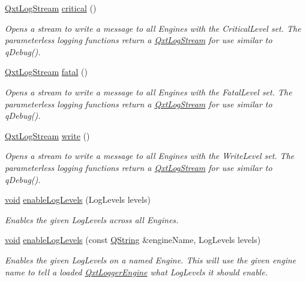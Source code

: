 \begin{DoxyCompactItemize}
\hyperlink{class_qxt_log_stream}{Qxt\-Log\-Stream} \hyperlink{class_qxt_logger_a79869cad074c4d85e35ce0b5f1ea0458}{critical} ()
\begin{DoxyCompactList}\small\item\em Opens a stream to write a message to all Engines with the Critical\-Level set. The parameterless logging functions return a \hyperlink{class_qxt_log_stream}{Qxt\-Log\-Stream} for use similar to q\-Debug(). \end{DoxyCompactList}\item 
\hyperlink{class_qxt_log_stream}{Qxt\-Log\-Stream} \hyperlink{class_qxt_logger_a1b8e6e6c804011db81b59656d0a55081}{fatal} ()
\begin{DoxyCompactList}\small\item\em Opens a stream to write a message to all Engines with the Fatal\-Level set. The parameterless logging functions return a \hyperlink{class_qxt_log_stream}{Qxt\-Log\-Stream} for use similar to q\-Debug(). \end{DoxyCompactList}\item 
\hyperlink{class_qxt_log_stream}{Qxt\-Log\-Stream} \hyperlink{class_qxt_logger_ac01dffce7f7f018f434c70e9557f95f1}{write} ()
\begin{DoxyCompactList}\small\item\em Opens a stream to write a message to all Engines with the Write\-Level set. The parameterless logging functions return a \hyperlink{class_qxt_log_stream}{Qxt\-Log\-Stream} for use similar to q\-Debug(). \end{DoxyCompactList}\item 
\hyperlink{group___u_a_v_objects_plugin_ga444cf2ff3f0ecbe028adce838d373f5c}{void} \hyperlink{class_qxt_logger_a84d81e3625ab75fec30a33610ccedc8a}{enable\-Log\-Levels} (Log\-Levels levels)
\begin{DoxyCompactList}\small\item\em Enables the given Log\-Levels across all Engines. \end{DoxyCompactList}\item 
\hyperlink{group___u_a_v_objects_plugin_ga444cf2ff3f0ecbe028adce838d373f5c}{void} \hyperlink{class_qxt_logger_a86ee83d843731a17b386268d35b21f53}{enable\-Log\-Levels} (const \hyperlink{group___u_a_v_objects_plugin_gab9d252f49c333c94a72f97ce3105a32d}{Q\-String} \&engine\-Name, Log\-Levels levels)
\begin{DoxyCompactList}\small\item\em Enables the given Log\-Levels on a named Engine. This will use the given engine name to tell a loaded \hyperlink{class_qxt_logger_engine}{Qxt\-Logger\-Engine} what Log\-Levels it should enable. \end{DoxyCompactList}\item 

\end{DoxyCompactItemize}
